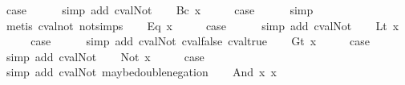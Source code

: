 \begin{isabellebody}
\ {\isacharquery}case\isanewline
\ \ \ \ \isamarkupfalse%
\ {\isacharparenleft}simp\ add{\isacharcolon}\ cval{\isacharunderscore}Not{\isacharparenright}\isanewline
{}\isamarkupfalse%
\isanewline
\ \ \isamarkupfalse%
\ {\isacharparenleft}Bc\ x{\isacharparenright}\isanewline
\ \ \isamarkupfalse%
\ \isamarkupfalse%
\ {\isacharquery}case\isanewline
\ \ \ \ \isamarkupfalse%
\ simp\isanewline
\ \ \ \ \isamarkupfalse%
\ {\isacharparenleft}metis\ cval{\isacharunderscore}not\ not{\isachardot}simps{\isacharparenleft}{}{\isacharparenright}{\isacharparenright}\isanewline
{}\isamarkupfalse%
\isanewline
\ \ \isamarkupfalse%
\ {\isacharparenleft}Eq\ x{\isacharparenright}\isanewline
\ \ \isamarkupfalse%
\ \isamarkupfalse%
\ {\isacharquery}case\isanewline
\ \ \ \ \isamarkupfalse%
\ {\isacharparenleft}simp\ add{\isacharcolon}\ cval{\isacharunderscore}Not{\isacharparenright}\isanewline
{}\isamarkupfalse%
\isanewline
\ \ \isamarkupfalse%
\ {\isacharparenleft}Lt\ x{\isacharparenright}\isanewline
\ \ \isamarkupfalse%
\ \isamarkupfalse%
\ {\isacharquery}case\isanewline
\ \ \ \ \isamarkupfalse%
\ {\isacharparenleft}simp\ add{\isacharcolon}\ cval{\isacharunderscore}Not\ cval{\isacharunderscore}false\ cval{\isacharunderscore}true{\isacharparenright}\isanewline
{}\isamarkupfalse%
\isanewline
\ \ \isamarkupfalse%
\ {\isacharparenleft}Gt\ x{\isacharparenright}\isanewline
\ \ \isamarkupfalse%
\ \isamarkupfalse%
\ {\isacharquery}case\isanewline
\ \ \ \ \isamarkupfalse%
\ {\isacharparenleft}simp\ add{\isacharcolon}\ cval{\isacharunderscore}Not{\isacharparenright}\isanewline
{}\isamarkupfalse%
\isanewline
\ \ \isamarkupfalse%
\ {\isacharparenleft}Not\ x{\isacharparenright}\isanewline
\ \ \isamarkupfalse%
\ \isamarkupfalse%
\ {\isacharquery}case\isanewline
\ \ \ \ \isamarkupfalse%
\ {\isacharparenleft}simp\ add{\isacharcolon}\ cval{\isacharunderscore}Not\ maybe{\isacharunderscore}double{\isacharunderscore}negation{\isacharparenright}\isanewline
{}\isamarkupfalse%
\isanewline
\ \ \isamarkupfalse%
\ {\isacharparenleft}And\ x{}\ x{}{\isacharparenright}\isanewline
\ \ \isamarkupfalse%

\end{isabellebody}
